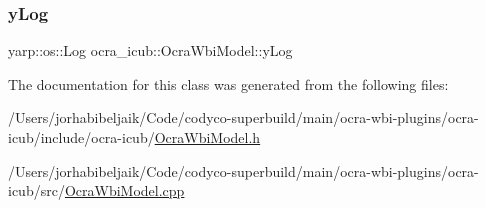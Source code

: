 \hypertarget{classocra__icub_1_1OcraWbiModel_a047fe9f9a96794af218ea844f09cd402}{}\label{classocra__icub_1_1OcraWbiModel_a047fe9f9a96794af218ea844f09cd402} 
\subsubsection{\texorpdfstring{y\+Log}{yLog}}
{\footnotesize\ttfamily yarp\+::os\+::\+Log ocra\+\_\+icub\+::\+Ocra\+Wbi\+Model\+::y\+Log\hspace{0.3cm}{\ttfamily [private]}}



The documentation for this class was generated from the following files\+:\begin{DoxyCompactItemize}
\item 
/\+Users/jorhabibeljaik/\+Code/codyco-\/superbuild/main/ocra-\/wbi-\/plugins/ocra-\/icub/include/ocra-\/icub/\hyperlink{OcraWbiModel_8h}{Ocra\+Wbi\+Model.\+h}\item 
/\+Users/jorhabibeljaik/\+Code/codyco-\/superbuild/main/ocra-\/wbi-\/plugins/ocra-\/icub/src/\hyperlink{OcraWbiModel_8cpp}{Ocra\+Wbi\+Model.\+cpp}\end{DoxyCompactItemize}
